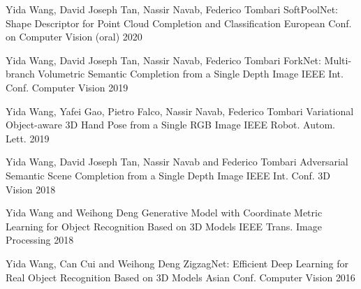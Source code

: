


\begin{cventries}

\cventry
{Yida Wang, David Joseph Tan, Nassir Navab, Federico Tombari} %
{SoftPoolNet: Shape Descriptor for Point Cloud Completion and Classification} %
{European Conf. on Computer Vision (oral)} %
{\href{https://www.youtube.com/watch?v=1WZ16bGff1o}{} 2020} %
{ %
}

\cventry
{Yida Wang, David Joseph Tan, Nassir Navab, Federico Tombari} %
{ForkNet: Multi-branch Volumetric Semantic Completion from a Single Depth Image} %
{IEEE Int. Conf. Computer Vision} %
{\href{https://www.youtube.com/watch?v=1WZ16bGff1o}{} 2019} %
{ %
}

\cventry
{Yida Wang, Yafei Gao, Pietro Falco, Nassir Navab, Federico Tombari} %
{Variational Object-aware 3D Hand Pose from a Single RGB Image} %
{IEEE Robot. Autom. Lett.} %
{\href{https://www.youtube.com/watch?v=tSTQ2NTqB4A}{} 2019} %
{ %
}

\cventry
{Yida Wang, David Joseph Tan, Nassir Navab and Federico Tombari} %
{Adversarial Semantic Scene Completion from a Single Depth Image} %
{IEEE Int. Conf. 3D Vision} %
{\href{https://www.youtube.com/watch?v=udvBhkupwXE&t=1s}{} 2018} %
{ %
}

\cventry
{Yida Wang and Weihong Deng} %
{Generative Model with Coordinate Metric Learning for Object Recognition Based on 3D Models} %
{IEEE Trans. Image Processing} %
{2018} %
{ %
}


\cventry
{Yida Wang, Can Cui and Weihong Deng} %
{ZigzagNet: Efficient Deep Learning for Real Object Recognition Based on 3D Models} %
{Asian Conf. Computer Vision} %
{2016} %
{ %
}


\end{cventries}

